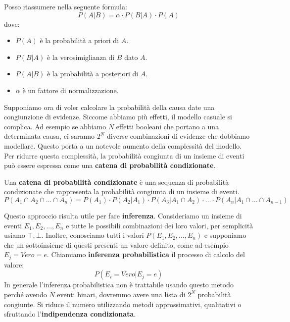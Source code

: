 Posso riassumere nella seguente formula:
\begin{equation}
    P(A|B) = \alpha \cdot P(B | A) \cdot P(A)
\end{equation}
dove:
\begin{itemize}
    \item $P(A)$ è la probabilità a priori di $A$.
    \item $P(B|A)$ è la verosimiglianza di $B$ dato $A$.
    \item $P(A|B)$ è la probabilità a posteriori di $A$.
    \item $\alpha$ è un fattore di normalizzazione.
\end{itemize}

Supponiamo ora di voler calcolare la probabilità della causa date una congiunzione
di evidenze. Siccome abbiamo più effetti, il modello casuale si complica.
Ad esempio se abbiamo $N$ effetti booleani che portano a una determinata causa, 
ci saranno $2^N$ diverse combinazioni di evidenze che dobbiamo modellare. 
Questo porta a un notevole aumento della complessità del modello. 
Per ridurre questa complessità, la probabilità congiunta di un insieme di eventi può essere
espressa come una \textbf{catena di probabilità condizionate}.
\begin{definizione}
    Una \textbf{catena di probabilità condizionate} è una sequenza di probabilità
    condizionate che rappresenta la probabilità congiunta di un insieme di eventi.
    \begin{equation}
        P(A_1 \cap A_2 \cap \ldots \cap A_n) = P(A_1) \cdot P(A_2|A_1) \cdot
        P(A_3|A_1 \cap A_2) \cdot \ldots \cdot P(A_n|A_1 \cap \ldots \cap A_{n-1})
    \end{equation}
\end{definizione}
Questo approccio risulta utile per fare \textbf{inferenza}. Consideriamo un
insieme di eventi $E_1, E_2, \dots, E_n$ e tutte le possibili combinazioni dei
loro valori, per semplicità usiamo $\top, \bot$. Inoltre, conosciamo tutti i
valori $P(E_1, E_2, \dots, E_n)$ e supponiamo che un sottoinsieme di questi
presenti un valore definito, come ad esempio $E_j = Vero = e$.
Chiamiamo \textbf{inferenza probabilistica} il processo di calcolo del valore:
\begin{equation}
    P(E_i = Vero|E_j=e)
\end{equation}
In generale l'inferenza probabilistica non è trattabile usando questo metodo 
perché avendo $N$ eventi binari, dovremmo avere una lista di $2^N$ probabilità congiunte.
Si riduce il numero utilizzando metodi approssimativi, qualitativi o sfruttando 
l'\textbf{indipendenza condizionata}. 

